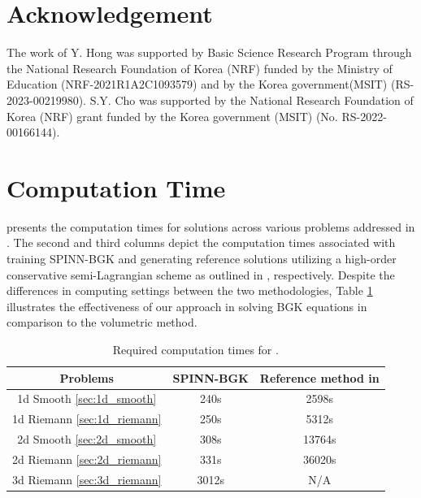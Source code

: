 \documentclass[preprint,12pt]{elsarticle}
\begin{document}
\section*{Acknowledgement}
The work of Y. Hong was supported by Basic Science Research Program through the National Research Foundation of Korea (NRF) funded by the Ministry of Education (NRF-2021R1A2C1093579) and by the Korea government(MSIT) (RS-2023-00219980). S.Y. Cho was supported by the
National Research Foundation of Korea (NRF) grant funded by the Korea government (MSIT) (No. RS-2022-00166144).


\appendix
\section{Computation Time} \label{app:a}
 presents the computation times for solutions across various problems addressed in .
The second and third columns depict the computation times associated with training SPINN-BGK and generating reference solutions utilizing a high-order conservative semi-Lagrangian scheme as outlined in \cite{cho2021conservative2}, respectively.
Despite the differences in computing settings between the two methodologies, Table \ref{tab:computation_time} illustrates the effectiveness of our approach in solving BGK equations in comparison to the volumetric method.


\begin{table}
    \centering
    \begin{tabular}{|c|c|c|}
    \hline
         Problems & SPINN-BGK & Reference method in \cite{cho2021conservative2} \\
         \hline
         1d Smooth \ref{sec:1d_smooth} & 240s & 2598s \\
         1d Riemann \ref{sec:1d_riemann} & 250s & 5312s\\
         2d Smooth \ref{sec:2d_smooth} & 308s & 13764s\\
         2d Riemann \ref{sec:2d_riemann} & 331s & 36020s\\
         3d Riemann \ref{sec:3d_riemann} & 3012s & N/A \\
    \hline
    \end{tabular}
    \caption{Required computation times for .}
    \label{tab:computation_time}
\end{table}
\end{document}
